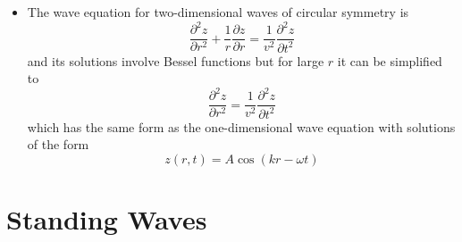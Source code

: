 \documentclass{article}
\begin{document}
\begin{itemize}
  \item The wave equation for two-dimensional waves of circular symmetry is \[\frac{\partial^2 z}{\partial r^2} + \frac{1}{r} \frac{\partial z}{\partial r} = \frac{1}{v^2} \frac{\partial^2 z}{\partial t^2}\] and its solutions involve Bessel functions but for large $r$ it can be simplified to \[\frac{\partial^2 z}{\partial r^2} = \frac{1}{v^2} \frac{\partial^2 z}{\partial t^2}\] which has the same form as the one-dimensional wave equation with solutions of the form \[z(r, t) = A \cos (k r - \omega t)\]
\end{itemize}

\section{Standing Waves}
\end{document}
